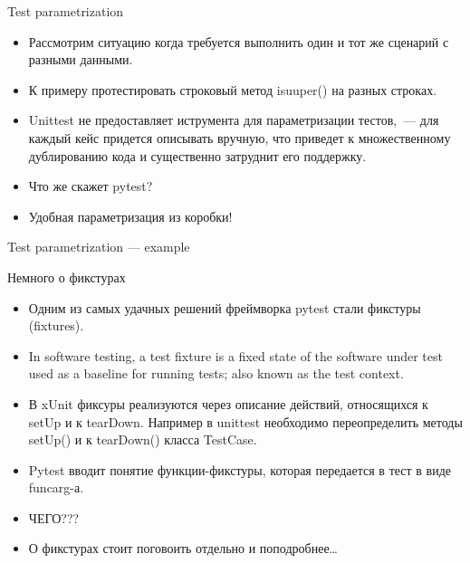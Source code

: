 \documentclass{beamer}
\begin{document}
\begin{frame}[fragile]{Test parametrization}
    \begin{itemize}
    \item Рассмотрим ситуацию когда требуется выполнить один и тот же сценарий с разными данными.
    \pause \item К примеру протестировать строковый метод isuuper() на разных строках.
    \pause \item Unittest не предоставляет иструмента для параметризации тестов,~--- для каждый кейс придется описывать вручную, что приведет к множественному дублированию кода и существенно затруднит его поддержку.
    \pause \item Что же скажет pytest?
    \pause \item Удобная параметризация из коробки!
    \end{itemize}
\end{frame}

\begin{frame}[fragile]{Test parametrization --- example}
\end{frame}

\begin{frame}[fragile]{Немного о фикстурах}
    \begin{itemize}
    \item Одним из самых удачных решений фреймворка pytest стали фикстуры (fixtures).
    \pause \item In software testing, a test fixture is a fixed state of the software
    under test used as a baseline for running tests; also known as the test context.
    \pause \item В xUnit фиксуры реализуются через описание действий, относящихся к setUp и к tearDown.
    Например в unittest необходимо переопределить методы setUp() и к tearDown() класса TestCase.
    \pause \item Pytest вводит понятие функции-фикстуры, которая передается в тест в виде funcarg-а.
    \pause \item ЧЕГО???
    \pause \item О фикстурах стоит поговоить отдельно и поподробнее\ldots
    \end{itemize}
\end{frame}
\end{document}
